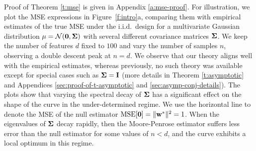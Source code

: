 \documentclass[11pt]{article}
\begin{document}
\noindent
Proof of Theorem \ref{t:mse} is given in Appendix \ref{a:mse-proof}.
For illustration, we plot the MSE expressions in Figure~\ref{f:intro}a,
comparing them with empirical estimates of the true MSE under the
i.i.d.~design for a multivariate Gaussian distribution
$\mu=\mathcal{N}(\mathbf 0,\mathbf{\Sigma})$ with several different covariance matrices $\mathbf{\Sigma}$. We keep the number of features $d$ fixed to
$100$ and vary the number of samples $n$, observing a double descent
peak at $n=d$. We observe that our theory aligns well with
the empirical estimates, whereas
previously, no such theory was available except for special
cases such as $\mathbf{\Sigma}=\mathbf I$ (more details in Theorem \ref{t:asymptotic}
and Appendices \ref{sec:proof-of-t-asymptotic} and \ref{sec:asymp-conj-details}). The plots
show that varying the spectral decay of $\mathbf{\Sigma}$ has a significant effect on the
shape of the curve in the under-determined regime. We use the
horizontal line to denote the MSE of the null estimator
$\mathrm{MSE}[\mathbf 0]=\|\mathbf w^*\|^2=1$. When the eigenvalues of $\mathbf{\Sigma}$
decay rapidly, then the Moore-Penrose estimator suffers less error
than the null estimator for some values of $n<d$, and the curve
exhibits a local optimum in this regime.
\end{document}
